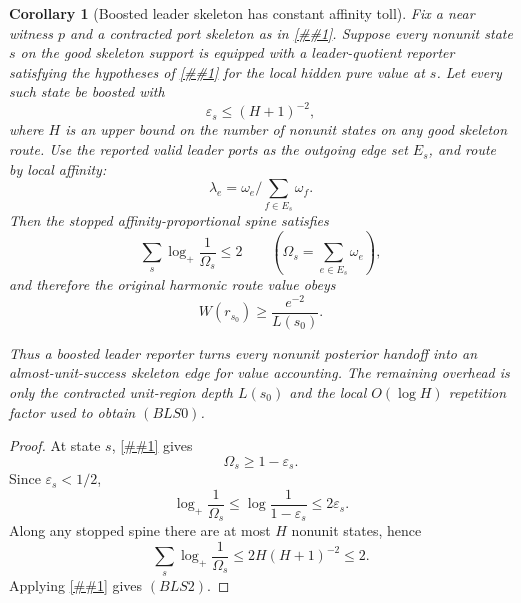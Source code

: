 \documentclass[10pt]{article}
\newcommand{\cref}[1]{\ref{##1}}
\newtheorem{corollary}[theorem]{Corollary}
\theoremstyle{definition}
\begin{document}
\begin{corollary}[Boosted leader skeleton has constant affinity toll]
   \label{cor:boosted-leader-skeleton-toll}
   Fix a near witness \(p\) and a contracted port skeleton as in
   \cref{cor:affinity-proportional-route-law}.  Suppose every nonunit state
   \(s\) on the good skeleton support is equipped with a leader-quotient
   reporter satisfying the hypotheses of
   \cref{cor:dyadic-leader-affinity-boost} for the local hidden pure value at
   \(s\).  Let every such state be boosted with
   \[
      \varepsilon_s\le(H+1)^{-2},
      \tag{BLS0}
   \]
   where \(H\) is an upper bound on the number of nonunit states on any good
   skeleton route.  Use the reported valid leader ports as the outgoing edge
   set \(E_s\), and route by local affinity:
   \[
      \lambda_e=\omega_e/\sum_{f\in E_s}\omega_f .
   \]
   Then the stopped affinity-proportional spine satisfies
   \[
      \sum_s\log_+\frac1{\Omega_s}\le 2
      \qquad
      \left(\Omega_s=\sum_{e\in E_s}\omega_e\right),
      \tag{BLS1}
   \]
   and therefore the original harmonic route value obeys
   \[
      W(r_{s_0})\ge \frac{e^{-2}}{L(s_0)} .
      \tag{BLS2}
   \]

   Thus a boosted leader reporter turns every nonunit posterior handoff into
   an almost-unit-success skeleton edge for value accounting.  The remaining
   overhead is only the contracted unit-region depth \(L(s_0)\) and the local
   \(O(\log H)\) repetition factor used to obtain \((BLS0)\).
\end{corollary}

\begin{proof}
   At state \(s\), \cref{cor:dyadic-leader-affinity-boost} gives
   \[
      \Omega_s\ge1-\varepsilon_s .
   \]
   Since \(\varepsilon_s<1/2\),
   \[
      \log_+\frac1{\Omega_s}
      \le
      \log\frac1{1-\varepsilon_s}
      \le2\varepsilon_s .
   \]
   Along any stopped spine there are at most \(H\) nonunit states, hence
   \[
      \sum_s\log_+\frac1{\Omega_s}
      \le
      2H(H+1)^{-2}
      \le2 .
   \]
   Applying \cref{cor:affinity-proportional-route-law} gives \((BLS2)\).
\end{proof}
\end{document}
